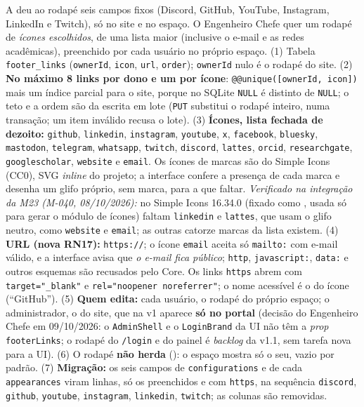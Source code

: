 {A  deu ao rodapé seis campos fixos (Discord, GitHub, YouTube, Instagram, LinkedIn e Twitch), só no site e no espaço. O Engenheiro Chefe quer um rodapé de \emph{ícones escolhidos}, de uma lista maior (inclusive o e-mail e as redes acadêmicas), preenchido por cada usuário no próprio espaço.}
{(1) Tabela \texttt{footer\_links} (\texttt{ownerId}, \texttt{icon}, \texttt{url}, \texttt{order}); \texttt{ownerId} nulo é o rodapé do site. (2) \textbf{No máximo 8 links por dono e um por ícone}: \texttt{@@unique([ownerId, icon])} mais um índice parcial para o site, porque no SQLite \texttt{NULL} é distinto de \texttt{NULL}; o teto e a ordem são da escrita em lote (\texttt{PUT} substitui o rodapé inteiro, numa transação; um item inválido recusa o lote). (3) \textbf{Ícones, lista fechada de dezoito:} \texttt{github}, \texttt{linkedin}, \texttt{instagram}, \texttt{youtube}, \texttt{x}, \texttt{facebook}, \texttt{bluesky}, \texttt{mastodon}, \texttt{telegram}, \texttt{whatsapp}, \texttt{twitch}, \texttt{discord}, \texttt{lattes}, \texttt{orcid}, \texttt{researchgate}, \texttt{googlescholar}, \texttt{website} e \texttt{email}. Os ícones de marcas são do Simple Icons (CC0), SVG \emph{inline} do projeto; a interface confere a presença de cada marca e desenha um glifo próprio, sem marca, para a que faltar. \emph{Verificado na integração da M23 (M-040, 08/10/2026):} no Simple Icons 16.34.0 (fixado como , usada só para gerar o módulo de ícones) faltam \texttt{linkedin} e \texttt{lattes}, que usam o glifo neutro, como \texttt{website} e \texttt{email}; as outras catorze marcas da lista existem. (4) \textbf{URL (nova RN17):} \texttt{https://}; o ícone \texttt{email} aceita só \texttt{mailto:} com e-mail válido, e a interface avisa que \emph{o e-mail fica público}; \texttt{http}, \texttt{javascript:}, \texttt{data:} e outros esquemas são recusados pelo Core. Os links \texttt{https} abrem com \texttt{target="\_blank"} e \texttt{rel="noopener noreferrer"}; o nome acessível é o do ícone (``GitHub''). (5) \textbf{Quem edita:} cada usuário, o rodapé do próprio espaço; o administrador, o do site, que na v1 aparece \textbf{só no portal} (decisão do Engenheiro Chefe em 09/10/2026: o \texttt{AdminShell} e o \texttt{LoginBrand} da UI não têm a \emph{prop} \texttt{footerLinks}; o rodapé do \texttt{/login} e do painel é \emph{backlog} da v1.1, sem tarefa nova para a UI). (6) O rodapé \textbf{não herda} (): o espaço mostra só o seu, vazio por padrão. (7) \textbf{Migração:} os seis campos de \texttt{configurations} e de cada \texttt{appearances} viram linhas, só os preenchidos e com \texttt{https}, na sequência \texttt{discord}, \texttt{github}, \texttt{youtube}, \texttt{instagram}, \texttt{linkedin}, \texttt{twitch}; as colunas são removidas.}
